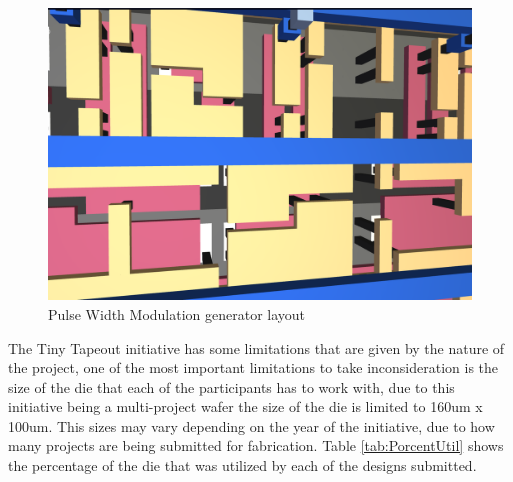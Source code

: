 \begin{figure}[H]
    \centering
        \includegraphics[width=\linewidth]{Pictures/Specific_Layout.png}
    \caption{Pulse Width Modulation generator layout}\label{fig:Specific_Layout}
\end{figure}

The Tiny Tapeout initiative has some limitations that are given by the nature of the project, one of 
the most important limitations to take inconsideration is the size of the die that each of the participants has 
to work with, due to this initiative being a multi-project wafer the size of the die is limited to 160um x 100um. 
This sizes may vary depending on the year of the initiative, due to how many projects are being submitted for fabrication. 
Table \ref*{tab:PorcentUtil} shows the percentage of the die that was utilized by each of the designs submitted.

\begin{table}[H]
    \centering
    \caption{Porcentaje utilize in length of waver per circuit}\label{tab:PorcentUtil}
    \end{table}

    